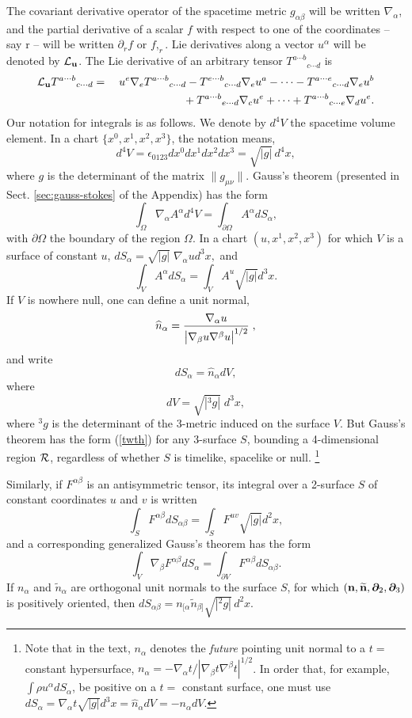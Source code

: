 \documentclass[12pt]{article}
\def\a{\alpha}
\def\b{\beta}
\def\be{\begin{equation}}
\def\ee{\end{equation}}
\def\ba{\begin{eqnarray}}
\def\ea{\end{eqnarray}}
\newcommand{\na}{\nabla}
\def\a{\alpha}
\def\b{\beta}
\begin{document}
{The covariant derivative operator of the spacetime metric
$g_{\alpha\beta}$ will be written $\nabla_\alpha$, and the partial
derivative of a scalar $f$
with respect to one of the coordinates -- say r -- will be written
$\partial_r f$ or $f,_r$.  Lie derivatives along a vector $u^\alpha$
will be denoted by ${\cal L}_{\bf u}$.  The Lie derivative of an
arbitrary
tensor $T^{a\cdots b}{}_{c\cdots d}$ is
\ba
{\cal L}_{\bf u} T^{a\cdots b}{}_{c\cdots d} &=&
u^e\nabla_e T^{a\cdots b}{}_{c\cdots d}
-T^{e\cdots b}{}_{c\cdots d}\nabla_e u^a
- \cdots
- T^{a\cdots e}{}_{c\cdots d}\nabla_e u^b
 \nonumber \\
&&\phantom{u^e\nabla_e T^{a\cdots b}{}_{c\cdots d}}
+ T^{a\cdots b}{}_{e\cdots d}\nabla_c u^e+ \cdots
+ T^{a\cdots b}{}_{c\cdots e}\nabla_d u^e. \label{Lieiii}
\ea
Our notation for integrals is as follows.  We denote by $d^4V$ the
spacetime volume element.  In a chart $\{x^0, x^1, x^2, x^3\}$, the
notation 
means,
\be
d^4V = \epsilon_{0123} dx^0 dx^1 dx^2 dx^3 = \sqrt{|g|}\, d^4x,
\label{dtauii}
\ee
where $g$ is the determinant of the matrix $\|g_{\mu\nu}\|$. 
Gauss's theorem (presented in Sect. \ref{sec:gauss-stokes} of the Appendix) has the form
\be
\int_{\Omega} \nabla_\alpha A^\alpha d^4V= \int_{\partial\Omega} A^\alpha 
dS_\alpha,
\label{twth}
\ee 
with $\partial\Omega$ the boundary of the region $\Omega$. 
In a chart $(u, x^1, x^2, x^3)$ for which $V$ is a surface of
constant $u$, $ dS_\alpha = \sqrt{|g|}\; \nabla_\alpha u d^3x,$ and
\be
\int_V A^\alpha dS_\alpha = \int_V A^u \sqrt{|g|} d^3x  .\label{dSaii}
\ee
If $V$ is nowhere null, one can define a unit normal,
\be
\widehat n_\alpha = {{\nabla_\alpha u}\over{\big|\nabla_\beta u \nabla^\beta
u\big|^{1/2}}}\;,\label{na}
\ee
and write
\be  dS_\alpha = \widehat n_\alpha dV,
\ee
where
\be dV = \sqrt{|^3g|}\;d^3x,\label{dSaiii}
\ee
where ${}^3g$ is the determinant of the 3-metric induced on the surface $V$.
But Gauss's theorem has the form (\ref{twth})
for any 3-surface $S$, bounding a 4-dimensional region
${\cal R}$, regardless of whether $S$ is timelike, spacelike or null.%
\footnote{
Note that in the text, $n_\a$ denotes the {\em future} pointing unit normal
to a $t=$ constant hypersurface, $n_\a = -\na_\a t/|\na_\b t\na^\b t|^{1/2}$. 
In order that, for example, $\int \rho u^\a dS_\a$, be positive on a 
$t=$ constant surface, one must use $dS_\a = \na_\a t \sqrt{|g|}d^3x 
= \widehat n_\a dV = -n_\a dV$.}

Similarly, if $F^{\a\b}$ is an antisymmetric tensor, its integral over 
a 2-surface $S$ of constant coordinates $u$ and $v$ is written
\be
\int_S F^{\a\b} dS_{\a\b} = \int_S F^{uv} \sqrt{|g|}d^2 x,
\label{dSab}
\ee
and a corresponding generalized Gauss's theorem has the form
\be
\int_V \na_\b F^{\a\b} dS_\a = \int_{\partial V} F^{\a\b} dS_{\a\b}.
\label{eq:gauss0}
\ee
If $n_\a$ and $\widetilde n_\a$ are orthogonal unit normals to the 
surface $S$, for which $({\bf n, \widetilde n}, \bm\partial_2, \bm\partial_3)$ 
is positively oriented, then $dS_{\a\b} = n_{[\a}\widetilde n_{\b]} \sqrt{|^2g|}\, d^2x$.

}
\end{document}
